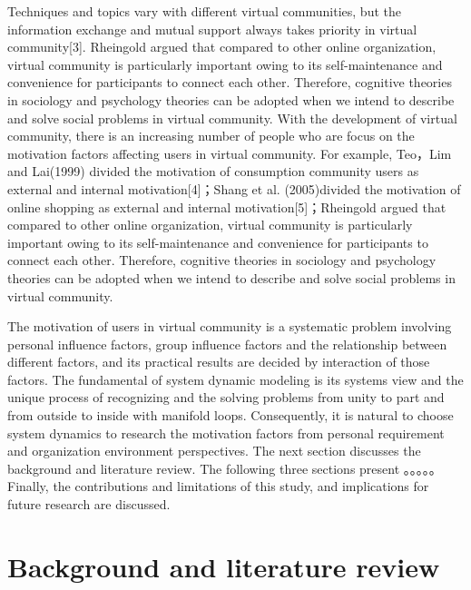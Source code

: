 \documentclass{elsarticle}
\begin{document}
Techniques and topics vary with different virtual communities, but the
information exchange and mutual support always takes priority in
virtual community[3]. Rheingold argued that compared to other online
organization, virtual community is particularly important owing to its
self-maintenance and convenience for participants to connect each
other. Therefore, cognitive theories in sociology and psychology
theories can be adopted when we intend to describe and solve social
problems in virtual community. With the development of virtual
community, there is an increasing number of people who are focus on
the motivation factors affecting users in virtual community. For
example, Teo，Lim and Lai(1999) divided the motivation of consumption
community users as external and internal motivation[4]；Shang et
al. (2005)divided the motivation of online shopping as external and
internal motivation[5]；Rheingold argued that compared to other online
organization, virtual community is particularly important owing to its
self-maintenance and convenience for participants to connect each
other. Therefore, cognitive theories in sociology and psychology
theories can be adopted when we intend to describe and solve social
problems in virtual community.

The motivation of users in virtual community is a systematic problem involving personal influence factors, group influence factors and the relationship between different factors, and its practical results are decided by interaction of those factors. The fundamental of system dynamic modeling is its systems view and the unique process of recognizing and the solving problems from unity to part and from outside to inside with manifold loops. Consequently, it is natural to choose system dynamics to research the motivation factors from personal requirement and organization environment perspectives. 
The next section discusses the background and literature review. The following three sections present  。。。。。  Finally, the contributions and limitations of this study, and implications for future research are discussed.

\section{Background and literature review}
\label{sec:backgr-liter-revi}
\end{document}

